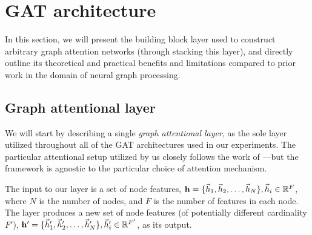 \documentclass{article} %
\begin{document}
\section{GAT architecture}
\label{headings}

In this section, we will present the building block layer used to construct arbitrary graph attention networks (through stacking this layer), and directly outline its theoretical and practical benefits and limitations compared to prior work in the domain of neural graph processing.

\subsection{Graph attentional layer}
\label{ssec:gal}
We will start by describing a single \emph{graph attentional layer}, as the sole layer utilized throughout all of the GAT architectures used in our experiments. The particular attentional setup utilized by us closely follows 
the work of \cite{bahdanau2014neural}---but the framework is agnostic to the particular choice of attention mechanism.

The input to our layer is a set of node features, ${\bf h} = \{\vec{h}_1, \vec{h}_2, \dots, \vec{h}_N\}, \vec{h}_i \in \mathbb{R}^F$, where $N$ is the number of nodes, and $F$ is the number of features in each node. The layer produces a new set of node features (of potentially different cardinality $F'$), ${\bf h}' = \{\vec{h}_1', \vec{h}_2', \dots, \vec{h}_N'\}, \vec{h}_i' \in \mathbb{R}^{F'}$, as its output.
\end{document}
